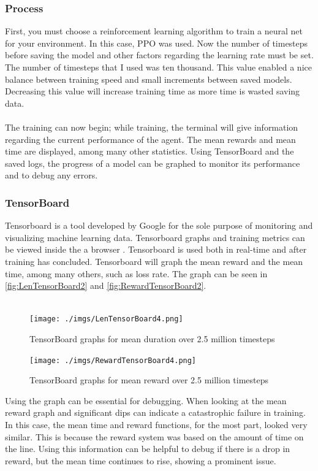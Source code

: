 \documentclass[a4paper,12pt]{article}
\begin{document}
\subsubsection{Process}

First, you must choose a reinforcement learning algorithm to train a neural net for your environment. In this case, PPO was used. Now the number of timesteps before saving the model and other factors regarding the learning rate must be set. The number of timesteps that I used was ten thousand. This value enabled a nice balance between training speed and small increments between saved models. Decreasing this value will increase training time as more time is wasted saving data. 
\\\\
The training can now begin; while training, the terminal will give information regarding the current performance of the agent. The mean rewards and mean time are displayed, among many other statistics. Using TensorBoard and the saved logs, the progress of a model can be graphed to monitor its performance and to debug any errors.


\subsubsection{TensorBoard}

Tensorboard is a tool developed by Google for the sole purpose of monitoring and visualizing machine learning data. Tensorboard graphs and training metrics can be viewed inside the a browser \cite{pang2020deep}. Tensorboard is used both in real-time and after training has concluded. Tensorboard will graph the mean reward and the mean time, among many others, such as loss rate.  The graph can be seen in \autoref{fig:LenTensorBoard2} and \autoref{fig:RewardTensorBoard2}.
\\\\
\begin{figure}[H]
\centering
\texttt{[image: ./imgs/LenTensorBoard4.png]}
\caption{TensorBoard graphs for mean duration over 2.5 million timesteps}
\label{fig:LenTensorBoard2}
\end{figure}
\begin{figure}[H]
\centering
\texttt{[image: ./imgs/RewardTensorBoard4.png]}
\caption{TensorBoard graphs for mean reward over 2.5 million timesteps}
\label{fig:RewardTensorBoard2}
\end{figure}
\noindent
Using the graph can be essential for debugging. When looking at the mean reward graph and significant dips can indicate a catastrophic failure in training. In this case, the mean time and reward functions, for the most part, looked very similar. This is because the reward system was based on the amount of time on the line. Using this information can be helpful to debug if there is a drop in reward, but the mean time continues to rise, showing a prominent issue.
\end{document}
